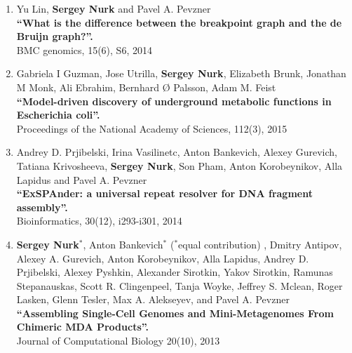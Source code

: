 \begin{enumerate}
\item 
Yu Lin, \textbf{Sergey Nurk} and Pavel A. Pevzner\\
\textbf{``What is the difference between the breakpoint graph and the de Bruijn graph?''.} \\
BMC genomics, 15(6), S6, 2014

\item Gabriela I Guzman, Jose Utrilla, \textbf{Sergey Nurk}, Elizabeth Brunk, Jonathan M Monk, Ali Ebrahim, Bernhard Ø Palsson, Adam M. Feist\\
\textbf{``Model-driven discovery of underground metabolic functions in Escherichia coli''.} \\
Proceedings of the National Academy of Sciences, 112(3), 2015

\item Andrey D. Prjibelski, Irina Vasilinetc, Anton Bankevich, Alexey Gurevich, Tatiana Krivosheeva, \textbf{Sergey Nurk}, Son Pham, Anton Korobeynikov, Alla Lapidus and Pavel A. Pevzner\\
\textbf{``ExSPAnder: a universal repeat resolver for DNA fragment assembly''.} \\
Bioinformatics, 30(12), i293-i301, 2014

\item \textbf{Sergey Nurk}$^*$, Anton Bankevich$^*$ ($^*$equal contribution)%
, Dmitry Antipov, Alexey A. Gurevich, Anton Korobeynikov, Alla Lapidus, Andrey D. Prjibelski, Alexey Pyshkin, Alexander Sirotkin, Yakov Sirotkin, Ramunas Stepanauskas, Scott R. Clingenpeel, Tanja Woyke, Jeffrey S. Mclean, Roger Lasken, Glenn Tesler, Max A. Alekseyev, and Pavel A. Pevzner \\
\textbf{``Assembling Single-Cell Genomes and Mini-Metagenomes From Chimeric MDA Products''.} \\
Journal of Computational Biology 20(10), 2013



\end{enumerate}
